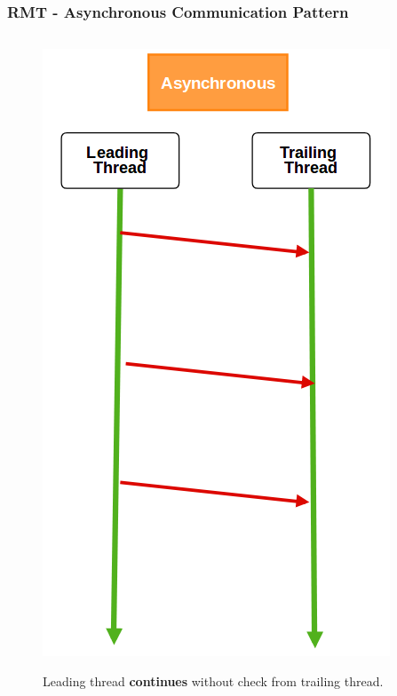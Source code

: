 \documentclass[xcolor=pdftex,dvipsnames,table]{beamer}
\begin{document}
\begin{frame}
	\frametitle{RMT - Asynchronous Communication Pattern}  
    
	\begin{columns}[c]
		\column{2in}
         	\begin{figure}[H]
            	\captionsetup{labelformat=empty,labelsep=none}
         		\begin{center} \includegraphics[scale=0.27]{Pattern-Async.png} \end{center}
                Leading thread \textbf{continues} without check from trailing thread.
     		\end{figure}
            

\end{columns}
\end{frame}
\end{document}
